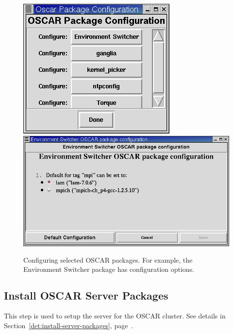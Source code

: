 \begin{figure}[ht!]
  \begin{center}
    \centerline{
      \includegraphics[scale=\imgscale]{figs/package-configuration}
      \hspace{\imghskip}
      \includegraphics[scale=\imgscale]{figs/package-configuration-switcher}
    }
    \caption{Configuring selected OSCAR packages.  For example, the
      Environment Switcher package has configuration options.}
    \label{fig:sbs-package-configuration}
  \end{center}
\end{figure}


\subsection{Install OSCAR Server Packages}

This step is used to setup the server for the OSCAR cluster.  See
details in Section~\ref{det:install-server-packages},
page~\pageref{det:install-server-packages}.

